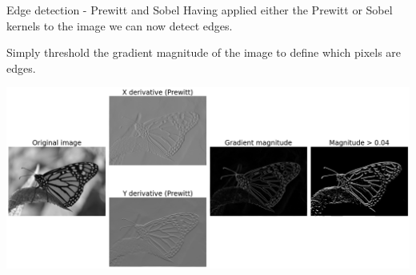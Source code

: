 \documentclass[9pt, aspectratio=169]{beamer}
\begin{document}
\begin{frame}
    {Edge detection - Prewitt and Sobel}
    Having applied either the Prewitt or Sobel kernels to the image we can now detect edges.

    Simply threshold the gradient magnitude of the image to define which pixels are edges.

    \centering
    \includegraphics[width=.9\textwidth]{monarch_prewitt.png}
\end{frame}
\end{document}
